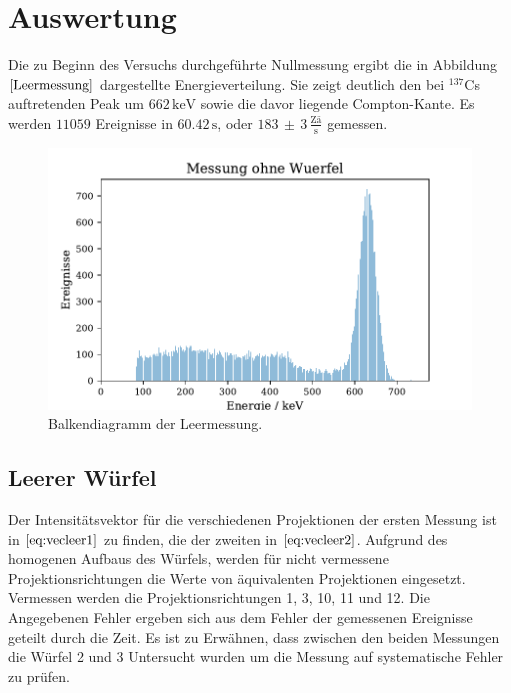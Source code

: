 \section{Auswertung}
Die zu Beginn des Versuchs durchgeführte Nullmessung ergibt die in Abbildung $\ref{Leermessung}$ dargestellte Energieverteilung. Sie zeigt deutlich den bei $^{137}$Cs auftretenden Peak um $662 \, \si{\kilo\electronvolt}$ sowie die davor liegende
Compton-Kante. Es werden $11059$ Ereignisse in $60.42 \, \si{\second}$, oder $183 \,  \pm \, 3\, \frac{\text{Zä}}{\si{\second}}$ gemessen.
\begin{figure}[H]
  \centering
  \includegraphics{plots/leer.pdf}
  \caption{Balkendiagramm der Leermessung.}
  \label{Leermessung}
\end{figure}
\subsection{Leerer Würfel}
Der Intensitätsvektor für die verschiedenen Projektionen der ersten Messung ist in $\ref{eq:vecleer1}$ zu finden, die der zweiten in $\ref{eq:vecleer2}$.
Aufgrund des homogenen Aufbaus des Würfels,
werden für nicht vermessene Projektionsrichtungen die Werte von äquivalenten Projektionen eingesetzt.
Vermessen werden die Projektionsrichtungen 1, 3, 10, 11 und 12. Die Angegebenen Fehler ergeben sich aus dem Fehler der gemessenen Ereignisse geteilt durch die Zeit. Es ist
zu Erwähnen, dass zwischen den beiden Messungen die Würfel 2 und 3 Untersucht wurden um die Messung auf systematische Fehler zu prüfen.

